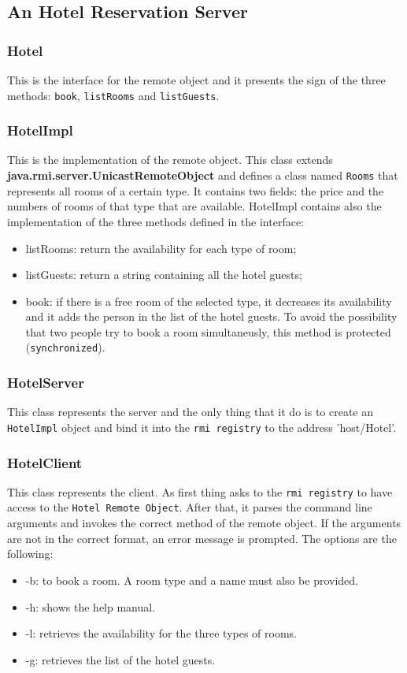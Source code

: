 \subsection{An Hotel Reservation Server}

\subsubsection{Hotel}
This is the interface for the remote object and it presents the sign of the three methods: \texttt{book}, \texttt{listRooms} and \texttt{listGuests}.

\subsubsection{HotelImpl}
This is the implementation of the remote object. This class extends \textbf{java.rmi.server.UnicastRemoteObject} and defines a class named \texttt{Rooms} that represents all rooms of a certain type. It contains two fields: the price and the numbers of rooms of that type that are available. HotelImpl contains also the implementation of the three methods defined in the interface:
\begin{itemize}
	\item listRooms: return the availability for each type of room;
	\item listGuests: return a string containing all the hotel guests;
	\item book: if there is a free room of the selected type, it decreases its availability and it adds the person in the list of the hotel guests. To avoid the possibility that two people try to book a room simultaneusly, this method is protected (\texttt{synchronized}).
\end{itemize}

\subsubsection{HotelServer}
This class represents the server and the only thing that it do is to create an \texttt{HotelImpl} object and bind it into the \texttt{rmi registry} to the address 'host/Hotel'.

\subsubsection{HotelClient}
This class represents the client. As first thing asks to the \texttt{rmi registry} to have access to the \texttt{Hotel Remote Object}. After that, it parses the command line arguments and invokes the correct method of the remote object. If the arguments are not in the correct format, an error message is prompted. The options are the following:
\begin{itemize}
	\item -b: to book a room. A room type and a name must also be provided.
	\item -h: shows the help manual.
	\item -l: retrieves the availability for the three types of rooms.
	\item -g: retrieves the list of the hotel guests.
\end{itemize}

